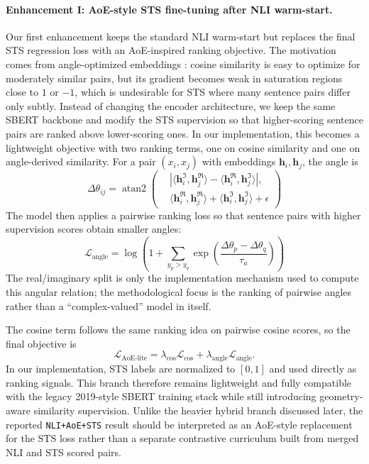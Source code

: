 \documentclass[letterpaper]{article} %
\begin{document}
\paragraph{Enhancement I: AoE-style STS fine-tuning after NLI warm-start.}
Our first enhancement keeps the standard NLI warm-start but replaces the final STS regression loss
with an AoE-inspired ranking objective. The motivation comes from angle-optimized embeddings
\cite{li-li-2024-aoe}: cosine similarity is easy to optimize for moderately similar pairs, but its
gradient becomes weak in saturation regions close to $1$ or $-1$, which is undesirable for STS where
many sentence pairs differ only subtly. Instead of changing the encoder architecture, we keep the same
SBERT backbone and modify the STS supervision so that higher-scoring sentence pairs are ranked above
lower-scoring ones. In our implementation, this becomes a lightweight objective with two ranking terms,
one on cosine similarity and one on angle-derived similarity. For a pair $(x_i,x_j)$ with embeddings
$\mathbf{h}_i,\mathbf{h}_j$, the angle is
\begin{equation}
\Delta\theta_{ij}=
\operatorname{atan2}\left(
\begin{aligned}
&\left|\langle \mathbf{h}_i^{\Im}, \mathbf{h}_j^{\Re}\rangle
- \langle \mathbf{h}_i^{\Re}, \mathbf{h}_j^{\Im}\rangle\right|, \\
&\langle \mathbf{h}_i^{\Re}, \mathbf{h}_j^{\Re}\rangle
+ \langle \mathbf{h}_i^{\Im}, \mathbf{h}_j^{\Im}\rangle + \epsilon
\end{aligned}
\right)
\end{equation}
The model then applies a pairwise ranking loss so that sentence pairs with higher supervision scores
obtain smaller angles:
\begin{equation}
\mathcal{L}_{\text{angle}}=
\log \left(1+\sum_{y_p>y_q}\exp\left(\frac{\Delta\theta_p-\Delta\theta_q}{\tau_a}\right)\right)
\end{equation}
The real/imaginary split is only the implementation mechanism used to compute this angular relation;
the methodological focus is the ranking of pairwise angles rather than a ``complex-valued'' model in
itself.

The cosine term follows the same ranking idea on pairwise cosine scores, so the final objective is
\begin{equation}
\mathcal{L}_{\text{AoE-lite}}=
\lambda_{\text{cos}}\mathcal{L}_{\text{cos}}+
\lambda_{\text{angle}}\mathcal{L}_{\text{angle}} .
\end{equation}
In our implementation, STS labels are normalized to $[0,1]$ and used directly as ranking signals.
This branch therefore remains lightweight and fully compatible with the legacy 2019-style SBERT
training stack while still introducing geometry-aware similarity supervision. Unlike the heavier
hybrid branch discussed later, the reported \texttt{NLI+AoE+STS} result should be interpreted as an
AoE-style replacement for the STS loss rather than a separate contrastive curriculum built from merged
NLI and STS scored pairs.
\end{document}

